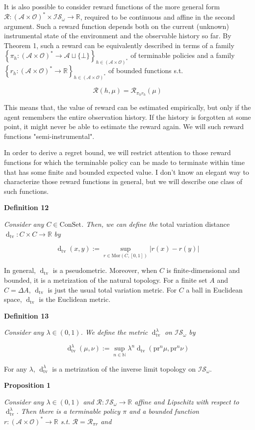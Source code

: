 \documentclass[a4paper]{article}
\newcommand{\Co}[1]{}
\newcommand{\AP}[1]{\left(#1\right)}
\newcommand{\AC}[1]{\left\{#1\right\}}
\newcommand{\Dtv}{\operatorname{d}_{\text{tv}}}
\newcommand{\Nats}{\mathbb{N}}
\newcommand{\Reals}{\mathbb{R}}
\newcommand{\Mor}{\mathrm{Mor}}
\newcommand{\Abs}[1]{\left\vert #1 \right\vert}
\newcommand{\A}{\mathcal{A}}
\newcommand{\AX}{\A\sqcup\{\bot\}}
\newcommand{\Ob}{\mathcal{O}}
\newcommand{\FH}{\AP{\A\times\Ob}^*}
\newcommand{\R}{\mathcal{R}}
\newcommand{\Con}{\boldsymbol{\mathrm{ConSet}}}
\newcommand{\IS}{\mathcal{IS}}
\newcommand{\Prj}{\mathrm{pr}}
\begin{document}
It is also possible to consider reward functions of the more general form $\R:\FH\times\IS_\omega\rightarrow\Reals$, required to be continuous and affine in the second argument. Such a reward function depends both on the current (unknown) instrumental state of the environment and the observable history so far. By Theorem 1, such a reward can be equivalently described in terms of a family $\AC{\pi_h:\FH\rightarrow\AX}_{h\in\FH}$ of terminable policies and a family $\AC{r_h:\FH\rightarrow\Reals}_{h\in\FH}$ of bounded functions s.t. 

$$\R(h,\mu)=\R_{\pi_h r_h}(\mu)$$

This means that, the value of reward can be estimated empirically, but only if the agent remembers the entire observation history. If the history is forgotten at some point, it might never be able to estimate the reward again. We will such reward functions "semi-instrumental".

In order to derive a regret bound, we will restrict attention to those reward functions for which the terminable policy can be made to terminate within time that has some finite and bounded expected value. I don't know an elegant way to characterize those reward functions in general, but we will describe one class of such functions.

\textbf{Definition 12}\Co{b}

\textit{Consider any $C\in\Con$. Then, we can define the} total variation distance $\Dtv:C\times C\rightarrow\Reals$ \textit{by}\Co{i}

$$\Dtv(x,y):=\sup_{r\in\Mor\AP{C,[0,1]}} \Abs{r(x)-r(y)}$$

In general, $\Dtv$ is a pseudometric. Moreover, when $C$ is finite-dimensional and bounded, it is a metrization of the natural topology. For a finite set $A$ and $C=\Delta A$, $\Dtv$ is just the usual total variation metric. For $C$ a ball in Euclidean space, $\Dtv$ is the Euclidean metric.

\textbf{Definition 13}\Co{b}

\textit{Consider any $\lambda\in(0,1)$. We define the metric} $\Dtv^\lambda$ \textit{on $\IS_\omega$ by}\Co{i}

$$\Dtv^\lambda(\mu,\nu):=\sup_{n\in\Nats}{\lambda^n\Dtv\AP{\Prj^n\mu,\Prj^n\nu}}$$

For any $\lambda$, $\Dtv^\lambda$ is a metrization of the inverse limit topology on $\IS_\omega$.

\textbf{Proposition 1}\Co{b}

\textit{Consider any $\lambda\in(0,1)$ and $\R:\IS_\omega\rightarrow\Reals$ affine and Lipschitz with respect to $\Dtv^\lambda$. Then there is a terminable policy $\pi$ and a bounded function $r:\FH\rightarrow\Reals$ s.t. $\R=\R_{\pi r}$ and}\Co{i}
\end{document}
